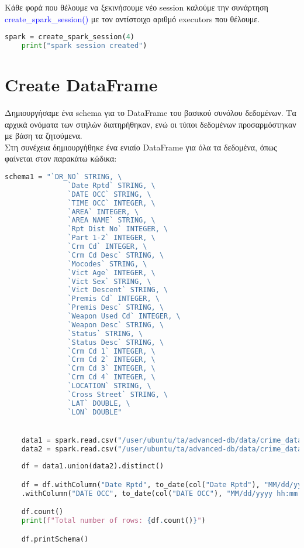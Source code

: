\documentclass{article}
\begin{document}
\vspace{1\baselineskip}

Κάθε φορά που θέλουμε να ξεκινήσουμε νέο session καλούμε την συνάρτηση 
\textcolor{blue}{create\_spark\_session()} με τον αντίστοιχο αριθμό executors που θέλουμε.

\begin{lstlisting}[language = Python]
    spark = create_spark_session(4)
    print("spark session created")  
\end{lstlisting}

\section{Create DataFrame}

Δημιουργήσαμε ένα schema για το DataFrame του βασικού συνόλου δεδομένων. Τα αρχικά ονόματα των στηλών διατηρήθηκαν, ενώ οι τύποι δεδομένων προσαρμόστηκαν με βάση τα ζητούμενα. \\
Στη συνέχεια δημιουργήθηκε ένα ενιαίο DataFrame για όλα τα δεδομένα, όπως φαίνεται στον παρακάτω κώδικα: 

\begin{lstlisting}[language = Python]
    schema1 = "`DR_NO` STRING, \
               `Date Rptd` STRING, \
               `DATE OCC` STRING, \
               `TIME OCC` INTEGER, \
               `AREA` INTEGER, \
               `AREA NAME` STRING, \
               `Rpt Dist No` INTEGER, \
               `Part 1-2` INTEGER, \
               `Crm Cd` INTEGER, \
               `Crm Cd Desc` STRING, \
               `Mocodes` STRING, \
               `Vict Age` INTEGER, \
               `Vict Sex` STRING, \
               `Vict Descent` STRING, \
               `Premis Cd` INTEGER, \
               `Premis Desc` STRING, \
               `Weapon Used Cd` INTEGER, \
               `Weapon Desc` STRING, \
               `Status` STRING, \
               `Status Desc` STRING, \
               `Crm Cd 1` INTEGER, \
               `Crm Cd 2` INTEGER, \
               `Crm Cd 3` INTEGER, \
               `Crm Cd 4` INTEGER, \
               `LOCATION` STRING, \
               `Cross Street` STRING, \
               `LAT` DOUBLE, \
               `LON` DOUBLE"


    data1 = spark.read.csv("/user/ubuntu/ta/advanced-db/data/crime_data_2010.csv", header=True, schema=schema1)
    data2 = spark.read.csv("/user/ubuntu/ta/advanced-db/data/crime_data_2020.csv", header=True, schema=schema1)
    
    df = data1.union(data2).distinct()

    df = df.withColumn("Date Rptd", to_date(col("Date Rptd"), "MM/dd/yyyy hh:mm:ss a")) \
    .withColumn("DATE OCC", to_date(col("DATE OCC"), "MM/dd/yyyy hh:mm:ss a"))

    df.count()
    print(f"Total number of rows: {df.count()}")

    df.printSchema()
\end{lstlisting}
\end{document}
